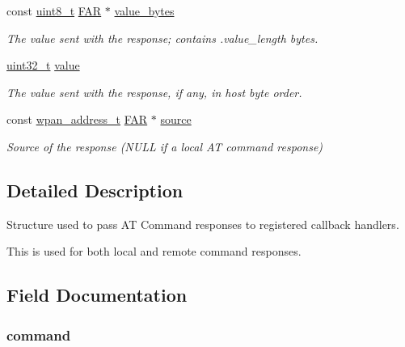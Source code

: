 \begin{DoxyCompactItemize}
const \hyperlink{group__hal_gae1affc9ca37cfb624959c866a73f83c2}{uint8\-\_\-t} \hyperlink{group__hal_gaef060b3456fdcc093a7210a762d5f2ed}{F\-A\-R} $\ast$ \hyperlink{structxbee__cmd__response__t_af6bfa5858cb10700bab8337ebdd26561}{value\-\_\-bytes}
\begin{DoxyCompactList}\small\item\em The value sent with the response; contains .value\-\_\-length bytes. \end{DoxyCompactList}\item 
\hyperlink{group__hal__dos_ga09a1e304d66d35dd47daffee9731edaa}{uint32\-\_\-t} \hyperlink{structxbee__cmd__response__t_ae7f66047e6e39ba2bb6af8b95f00d1dd}{value}
\begin{DoxyCompactList}\small\item\em The value sent with the response, if any, in host byte order. \end{DoxyCompactList}\item 
\hypertarget{structxbee__cmd__response__t_a1f8f524e73e197c24aef4fad585173b9}{const \hyperlink{structwpan__address__t}{wpan\-\_\-address\-\_\-t} \hyperlink{group__hal_gaef060b3456fdcc093a7210a762d5f2ed}{F\-A\-R} $\ast$ \hyperlink{structxbee__cmd__response__t_a1f8f524e73e197c24aef4fad585173b9}{source}}\label{structxbee__cmd__response__t_a1f8f524e73e197c24aef4fad585173b9}

\begin{DoxyCompactList}\small\item\em Source of the response (N\-U\-L\-L if a local A\-T command response) \end{DoxyCompactList}\end{DoxyCompactItemize}


\subsection{Detailed Description}
Structure used to pass A\-T Command responses to registered callback handlers. 

This is used for both local and remote command responses. 

\subsection{Field Documentation}
\hypertarget{structxbee__cmd__response__t_aa1e66c60bb56acaced6ca2646fd44616}{
\subsubsection[{command}]{ command}}\label{structxbee__cmd__response__t_aa1e66c60bb56acaced6ca2646fd44616}


